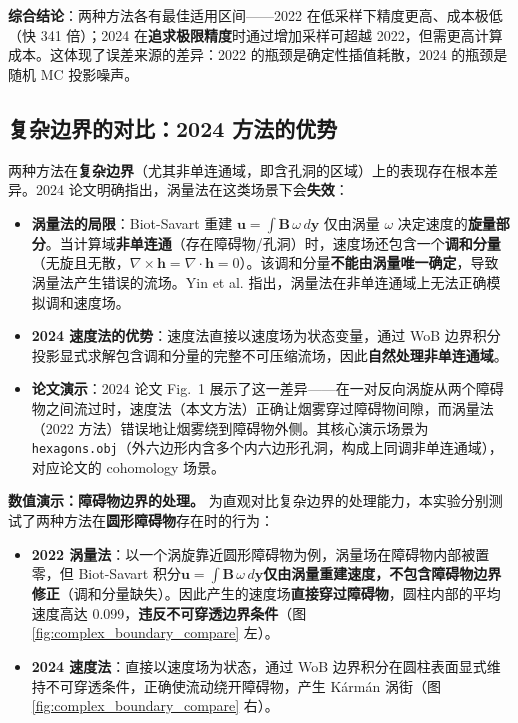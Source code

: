 \documentclass[12pt,a4paper]{article}
\begin{document}
\textbf{综合结论}：两种方法各有最佳适用区间——2022 在低采样下精度更高、成本极低（快 341 倍）；2024 在\textbf{追求极限精度}时通过增加采样可超越 2022，但需更高计算成本。这体现了误差来源的差异：2022 的瓶颈是确定性插值耗散，2024 的瓶颈是随机 MC 投影噪声。

\subsection{复杂边界的对比：2024 方法的优势}

两种方法在\textbf{复杂边界}（尤其非单连通域，即含孔洞的区域）上的表现存在根本差异。2024 论文明确指出，涡量法在这类场景下会\textbf{失效}：

\begin{itemize}
    \item \textbf{涡量法的局限}：Biot-Savart 重建 $\boldsymbol{u} = \int \boldsymbol{B}\,\omega\,d\boldsymbol{y}$ 仅由涡量 $\omega$ 决定速度的\textbf{旋量部分}。当计算域\textbf{非单连通}（存在障碍物/孔洞）时，速度场还包含一个\textbf{调和分量}（无旋且无散，$\nabla\times\boldsymbol{h}=\nabla\cdot\boldsymbol{h}=0$）。该调和分量\textbf{不能由涡量唯一确定}，导致涡量法产生错误的流场。Yin et al.\cite{yin2023} 指出，涡量法在非单连通域上无法正确模拟调和速度场。

    \item \textbf{2024 速度法的优势}：速度法直接以速度场为状态变量，通过 WoB 边界积分投影显式求解包含调和分量的完整不可压缩流场，因此\textbf{自然处理非单连通域}。

    \item \textbf{论文演示}：2024 论文 Fig.~1 展示了这一差异——在一对反向涡旋从两个障碍物之间流过时，速度法（本文方法）正确让烟雾穿过障碍物间隙，而涡量法（2022 方法）错误地让烟雾绕到障碍物外侧。其核心演示场景为 \texttt{hexagons.obj}（外六边形内含多个内六边形孔洞，构成上同调非单连通域），对应论文的 cohomology 场景。
\end{itemize}

\textbf{数值演示：障碍物边界的处理。} 为直观对比复杂边界的处理能力，本实验分别测试了两种方法在\textbf{圆形障碍物}存在时的行为：

\begin{itemize}
    \item \textbf{2022 涡量法}：以一个涡旋靠近圆形障碍物为例，涡量场在障碍物内部被置零，但 Biot-Savart 积分$\boldsymbol{u} = \int \boldsymbol{B}\,\omega\,d\boldsymbol{y}$\textbf{仅由涡量重建速度，不包含障碍物边界修正}（调和分量缺失）。因此产生的速度场\textbf{直接穿过障碍物}，圆柱内部的平均速度高达 0.099，\textbf{违反不可穿透边界条件}（图 \ref{fig:complex_boundary_compare} 左）。

    \item \textbf{2024 速度法}：直接以速度场为状态，通过 WoB 边界积分在圆柱表面显式维持不可穿透条件，正确使流动绕开障碍物，产生 Kármán 涡街（图 \ref{fig:complex_boundary_compare} 右）。
\end{itemize}
\end{document}
